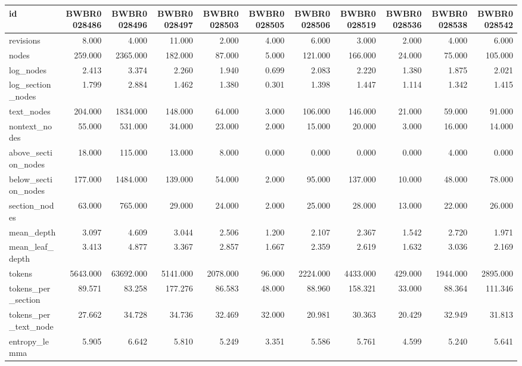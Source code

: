 \begin{tabular}{lrrrrrrrrrr}
\toprule
id & BWBR0028486 & BWBR0028496 & BWBR0028497 & BWBR0028503 & BWBR0028505 & BWBR0028506 & BWBR0028519 & BWBR0028536 & BWBR0028538 & BWBR0028542 \\
\midrule
revisions & 8.000 & 4.000 & 11.000 & 2.000 & 4.000 & 6.000 & 3.000 & 2.000 & 4.000 & 6.000 \\
\cline{1-11}
nodes & 259.000 & 2365.000 & 182.000 & 87.000 & 5.000 & 121.000 & 166.000 & 24.000 & 75.000 & 105.000 \\
\cline{1-11}
log\_nodes & 2.413 & 3.374 & 2.260 & 1.940 & 0.699 & 2.083 & 2.220 & 1.380 & 1.875 & 2.021 \\
\cline{1-11}
log\_section\_nodes & 1.799 & 2.884 & 1.462 & 1.380 & 0.301 & 1.398 & 1.447 & 1.114 & 1.342 & 1.415 \\
\cline{1-11}
text\_nodes & 204.000 & 1834.000 & 148.000 & 64.000 & 3.000 & 106.000 & 146.000 & 21.000 & 59.000 & 91.000 \\
\cline{1-11}
nontext\_nodes & 55.000 & 531.000 & 34.000 & 23.000 & 2.000 & 15.000 & 20.000 & 3.000 & 16.000 & 14.000 \\
\cline{1-11}
above\_section\_nodes & 18.000 & 115.000 & 13.000 & 8.000 & 0.000 & 0.000 & 0.000 & 0.000 & 4.000 & 0.000 \\
\cline{1-11}
below\_section\_nodes & 177.000 & 1484.000 & 139.000 & 54.000 & 2.000 & 95.000 & 137.000 & 10.000 & 48.000 & 78.000 \\
\cline{1-11}
section\_nodes & 63.000 & 765.000 & 29.000 & 24.000 & 2.000 & 25.000 & 28.000 & 13.000 & 22.000 & 26.000 \\
\cline{1-11}
mean\_depth & 3.097 & 4.609 & 3.044 & 2.506 & 1.200 & 2.107 & 2.367 & 1.542 & 2.720 & 1.971 \\
\cline{1-11}
mean\_leaf\_depth & 3.413 & 4.877 & 3.367 & 2.857 & 1.667 & 2.359 & 2.619 & 1.632 & 3.036 & 2.169 \\
\cline{1-11}
tokens & 5643.000 & 63692.000 & 5141.000 & 2078.000 & 96.000 & 2224.000 & 4433.000 & 429.000 & 1944.000 & 2895.000 \\
\cline{1-11}
tokens\_per\_section & 89.571 & 83.258 & 177.276 & 86.583 & 48.000 & 88.960 & 158.321 & 33.000 & 88.364 & 111.346 \\
\cline{1-11}
tokens\_per\_text\_node & 27.662 & 34.728 & 34.736 & 32.469 & 32.000 & 20.981 & 30.363 & 20.429 & 32.949 & 31.813 \\
\cline{1-11}
entropy\_lemma & 5.905 & 6.642 & 5.810 & 5.249 & 3.351 & 5.586 & 5.761 & 4.599 & 5.240 & 5.641 \\

\end{tabular}
